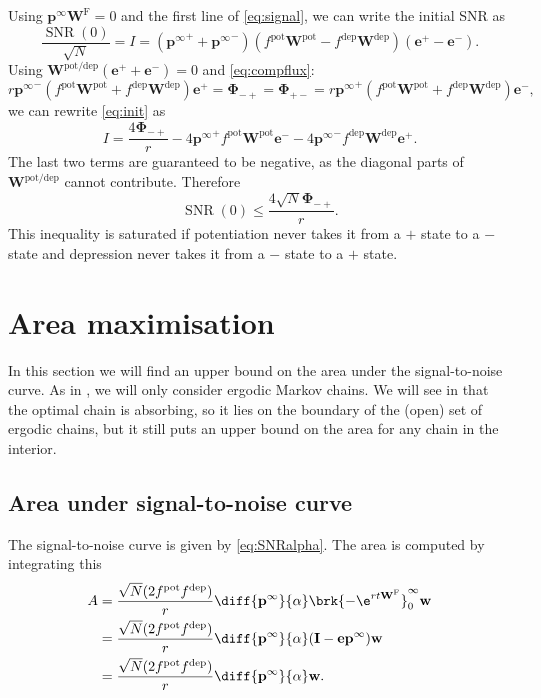 \documentclass{article} %
\DeclareMathOperator{\SNR}{SNR}
\newcommand{\I}{\mathbf{I}}
\newcommand{\onev}{\mathbf{e}}
\newcommand{\pr}{\mathbf{p}}
\newcommand{\eq}{\pr^\infty}
\newcommand{\w}{\mathbf{w}}
\newcommand{\W}{\mathbf{W}}
\newcommand{\frg}{\W^{\mathrm{F}}}
\newcommand{\F}{\boldsymbol{\Phi}}
\newcommand{\pot}{^{\text{pot}}}
\newcommand{\dep}{^{\text{dep}}}
\newcommand{\potdep}{^{\text{pot/dep}}}
\begin{document}
Using $\eq\frg=0$ and the first line of \eqref{eq:signal}, we can write the initial SNR as
%
\begin{equation}\label{eq:init}
  \frac{\SNR(0)}{\sqrt{N}} = I = ({\eq}^++{\eq}^-)(f\pot \W\pot -f\dep \W\dep )(\onev^+-\onev^-).
\end{equation}
%
Using $\W\potdep (\onev^++\onev^-)=0$ and \eqref{eq:compflux}:
%
\begin{equation*}
  r{\eq}^-(f\pot \W\pot +f\dep \W\dep )\onev^+ = \F_{-+} = \F_{+-} = r{\eq}^+(f\pot \W\pot +f\dep \W\dep )\onev^-,
\end{equation*}
%
we can rewrite \eqref{eq:init} as
%
\begin{equation}\label{eq:initflux}
  I = \frac{4\F_{-+}}{r} - 4{\eq}^+f\pot \W\pot \onev^- - 4{\eq}^-f\dep \W\dep \onev^+.
\end{equation}
%
The last two terms are guaranteed to be negative, as the diagonal parts of $\W\potdep $ cannot contribute.
Therefore
%
\begin{equation}\label{eq:initfluxineq}
  \SNR(0) \leq \frac{4\sqrt{N}\F_{-+}}{r}.
\end{equation}
%
This inequality is saturated if potentiation never takes it from a $+$ state to a $-$ state and depression never takes it from a $-$ state to a $+$ state.


\section{Area maximisation}\label{sec:areamax}

In this section we will find an upper bound on the area under the signal-to-noise curve.
As in , we will only consider ergodic Markov chains.
We will see in  that the optimal chain is absorbing, so it lies on the boundary of the (open) set of ergodic chains, but it still puts an upper bound on the area for any chain in the interior.

\subsection{Area under signal-to-noise curve}\label{sec:area}

The signal-to-noise curve is given by \eqref{eq:SNRalpha}.
The area is computed by integrating this
%
\begin{equation}\label{eq:area}
\begin{aligned}
  A &= \frac{\sqrt{N}(2f\pot f\dep )}{r} \diff{\eq}{\alpha} \brk{-\e^{rt\frg}}_0^\infty \w \\
    &= \frac{\sqrt{N}(2f\pot f\dep )}{r} \diff{\eq}{\alpha} (\I-\onev\eq) \w \\
    &= \frac{\sqrt{N}(2f\pot f\dep )}{r} \diff{\eq}{\alpha} \w.
\end{aligned}
\end{equation}
%
\end{document}
